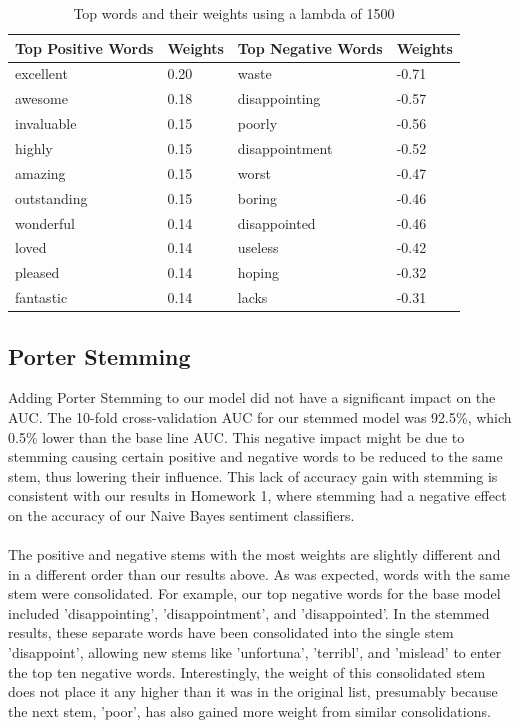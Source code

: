 \documentclass{article}
\begin{document}
\begin{table}[h]
    \begin{tabular}{|l|l|l|l|}
        \hline
        Top Positive Words & Weights & Top Negative Words & Weights \\ \hline
        excellent   & 0.20 & waste          & -0.71 \\ 
        awesome     & 0.18 & disappointing  & -0.57 \\ 
        invaluable  & 0.15 & poorly         & -0.56 \\ 
        highly      & 0.15 & disappointment & -0.52 \\ 
        amazing     & 0.15 & worst          & -0.47 \\ 
        outstanding & 0.15 & boring         & -0.46 \\ 
        wonderful   & 0.14 & disappointed   & -0.46 \\ 
        loved       & 0.14 & useless        & -0.42 \\ 
        pleased     & 0.14 & hoping         & -0.32 \\ 
        fantastic   & 0.14 & lacks          & -0.31 \\
        \hline
    \end{tabular}
    \caption{Top words and their weights using a lambda of 1500}
    \label{tab:words}
\end{table}


\subsection{Porter Stemming}

Adding Porter Stemming to our model did not have a significant impact on the AUC.  The 10-fold cross-validation AUC for our stemmed model was 92.5\%, which 0.5\% lower than the base line AUC. This negative impact might be due to stemming causing certain positive and negative words to be reduced to the same stem, thus lowering their influence. This lack of accuracy gain with stemming is consistent with our results in Homework 1, where stemming had a negative effect on the accuracy of our Naive Bayes sentiment classifiers.
\\\\The positive and negative stems with the most weights are slightly different and in a different order than our results above. As was expected, words with the same stem were consolidated. For example, our top negative words for the base model included 'disappointing', 'disappointment', and 'disappointed'. In the stemmed results, these separate words have been consolidated into the single stem 'disappoint', allowing new stems like 'unfortuna', 'terribl', and 'mislead' to enter the top ten negative words. Interestingly, the weight of this consolidated stem does not place it any higher than it was in the original list, presumably because the next stem, 'poor', has also gained more weight from similar consolidations.
\end{document}
